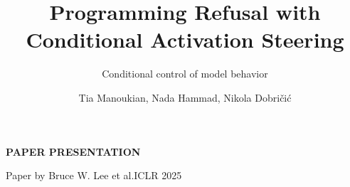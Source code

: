 \documentclass[aspectratio=169,11pt]{beamer}
\title{Programming Refusal with\\Conditional Activation Steering}
\subtitle{Conditional control of model behavior}
\author{Tia Manoukian, Nada Hammad, Nikola Dobričić}
\date{}
\begin{document}
\begin{frame}[plain]
  \vspace{6mm}
  {\small\color{accent}\bfseries PAPER PRESENTATION}\par
  \vspace{6mm}
  {\inserttitle\par}
  \vspace{5mm}
  {\color{accent}\insertsubtitle\par}
  \vspace{8mm}
  {\small\insertauthor\par}
  \vspace{3mm}
  {\scriptsize\color{muted}Paper by Bruce W. Lee et al.\enspace\textbar\enspace ICLR 2025\par}
  \vfill
\end{frame}
\end{document}
